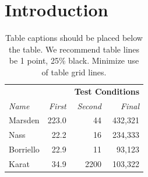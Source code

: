 \documentclass{sigchi-ext}
\begin{document}
\section{Introduction}


\begin{table}
  \centering
  \begin{tabular}{l r r r}
    & & \multicolumn{2}{c}{\small{\textbf{Test Conditions}}} \\
    \cmidrule(r){3-4}
    {\small\textit{Name}}
    & {\small \textit{First}}
      & {\small \textit{Second}}
    & {\small \textit{Final}} \\
    \midrule
    Marsden & 223.0 & 44 & 432,321 \\
    Nass & 22.2 & 16 & 234,333 \\
    Borriello & 22.9 & 11 & 93,123 \\
    Karat & 34.9 & 2200 & 103,322 \\
  \end{tabular}
  \caption{Table captions should be placed below the table. We
    recommend table lines be 1 point, 25\% black. Minimize use of
    table grid lines.}~\label{tab:table1}
\end{table}
\end{document}

